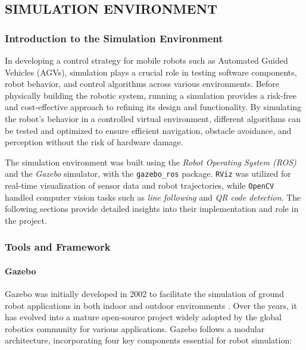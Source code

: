 \documentclass[../../main]{subfiles}
\begin{document}
\subsection{SIMULATION ENVIRONMENT}
\lstset{language=XML}
\subsubsection{Introduction to the Simulation Environment}
In developing a control strategy for mobile robots such as Automated Guided Vehicles (AGVs),
simulation plays a crucial role in testing software components, robot behavior, and control algorithms across various environments. 
Before physically building the robotic system, running a simulation provides a risk-free and cost-effective approach to refining 
its design and functionality. By simulating the robot's behavior in a controlled virtual environment, different algorithms can 
be tested and optimized to ensure efficient navigation, obstacle avoidance, and perception without the risk of hardware damage. 

The simulation environment was built using the \emph{Robot Operating System (ROS)} 
and the \emph{Gazebo} simulator, with the \texttt{gazebo\_ros} 
package. \texttt{RViz} was utilized for real-time visualization of sensor data and robot trajectories, 
while \texttt{OpenCV} handled computer vision tasks such as \textit{line following} and \textit{QR code detection}. The following sections provide 
detailed insights into their implementation and role in the project.\\
\newpage
\subsubsection{Tools and Framework}
\paragraph{Gazebo}

Gazebo was initially developed in 2002 to facilitate the simulation of ground robot applications in both indoor and outdoor environments \cite{koenig2004design}. 
Over the years, it has evolved into a mature open-source project widely adopted by the global robotics community for various applications. 
Gazebo follows a modular architecture, incorporating four key components essential for robot simulation:
\end{document}
